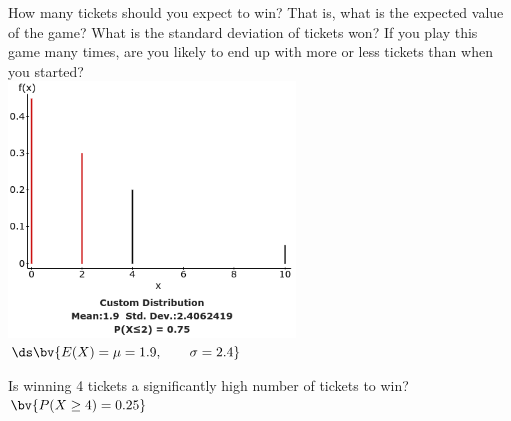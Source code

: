 \documentclass{article}
\begin{document}
\begin{flushleft}
\begin{enumalpha}
\item How many tickets should you expect to win? That is, what is the expected value of the game? What is the standard deviation of tickets won? If you play this game many times, are you likely to end up with more or less tickets than when you started?\\
\medskip
\includegraphics[width=3in]{images/group05_Q2_b}\\ 
\medskip
$\ds \bv{E(X) = \mu = 1.9, \qquad \sigma= 2.4}$\\
\medskip
{}
\vspace{.5in}

\item Is winning 4 tickets a significantly high number of tickets to win?\\
\medskip
$\bv{P(X \ge 4) = 0.25}$\qquad {}
\end{enumalpha} 
\end{flushleft}
\end{document}
